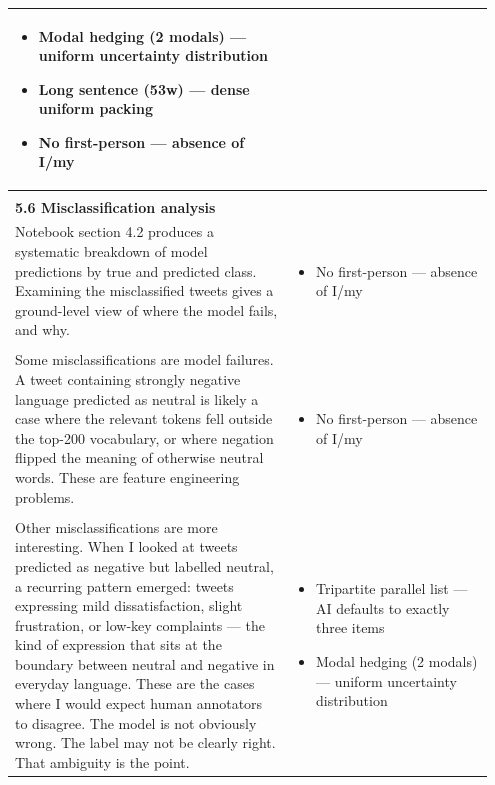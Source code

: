\documentclass[11pt]{article}
\begin{document}
\begin{longtable}{|p{0.55\linewidth}|p{0.40\linewidth}|}
\begin{itemize}[leftmargin=1em,itemsep=1pt,topsep=1pt,parsep=0pt]
  \item Modal hedging (2 modals) --- uniform uncertainty distribution
  \item Long sentence (53w) --- dense uniform packing
  \item No first-person --- absence of I/my
\end{itemize} \\[2pt]
\hline
\rule[-3.5cm]{0pt}{3.5cm} & \\
\hline
\textbf{5.6 Misclassification analysis}\\[4pt]
Notebook section 4.2 produces a systematic breakdown of model predictions by true and predicted class. Examining the misclassified tweets gives a ground-level view of where the model fails, and why. & \begin{itemize}[leftmargin=1em,itemsep=1pt,topsep=1pt,parsep=0pt]
  \item No first-person --- absence of I/my
\end{itemize} \\[2pt]
\hline
\rule[-3.5cm]{0pt}{3.5cm} & \\
\hline
Some misclassifications are model failures. A tweet containing strongly negative language predicted as neutral is likely a case where the relevant tokens fell outside the top-200 vocabulary, or where negation flipped the meaning of otherwise neutral words. These are feature engineering problems. & \begin{itemize}[leftmargin=1em,itemsep=1pt,topsep=1pt,parsep=0pt]
  \item No first-person --- absence of I/my
\end{itemize} \\[2pt]
\hline
\rule[-3.5cm]{0pt}{3.5cm} & \\
\hline
Other misclassifications are more interesting. When I looked at tweets predicted as negative but labelled neutral, a recurring pattern emerged: tweets expressing mild dissatisfaction, slight frustration, or low-key complaints --- the kind of expression that sits at the boundary between neutral and negative in everyday language. These are the cases where I would expect human annotators to disagree. The model is not obviously wrong. The label may not be clearly right. That ambiguity is the point. & \begin{itemize}[leftmargin=1em,itemsep=1pt,topsep=1pt,parsep=0pt]
  \item Tripartite parallel list --- AI defaults to exactly three items
  \item Modal hedging (2 modals) --- uniform uncertainty distribution

\end{itemize}
\end{longtable}
\end{document}
